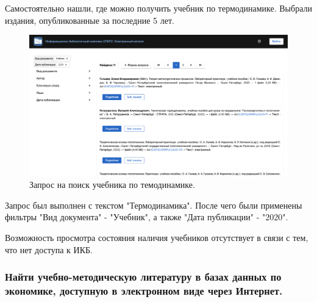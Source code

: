 \documentclass[14pt,a4paper,report]{report}
\begin{document}
\clearpage

Самостоятельно нашли, где можно получить учебник по термодинамике. Выбрали издания, опубликованные за последние 5 лет.

\begin{figure}[h!]
\centering
\includegraphics[scale = 0.33]{132.png}
\caption{Запрос на поиск учебника по темодинамике.}
\label{image:1}
\end{figure}

Запрос был выполнен с текстом "Термодинамика". После чего были применены фильтры "Вид документа" - "Учебник", а также "Дата публикации" - "2020".

Возможность просмотра состояния наличия учебников отсутствует в связи с тем, что нет доступа к ИКБ.

\subsubsection{Найти учебно-методическую литературу в базах данных по экономике, доступную в электронном виде через Интернет.}
\end{document}
